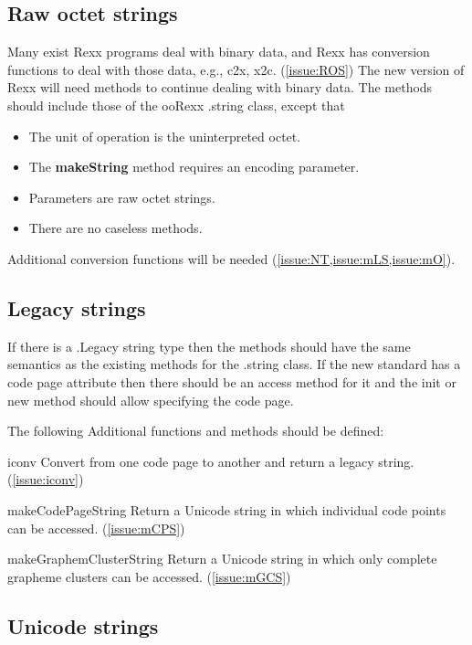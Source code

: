 \documentclass[b4paper]{article}
\begin{document}
\subsection{Raw octet strings}
Many exist Rexx programs deal with binary data,
and Rexx has conversion functions to deal with those data,
e.g., c2x, x2c.
(\cref{issue:ROS})
The new version of Rexx will need methods to continue dealing with binary data.
The methods should include those of the ooRexx .string class, except that
\begin{itemize}
\item The unit of operation is the uninterpreted octet.
\item The \textbf{makeString} method requires an encoding parameter.
\item Parameters are raw octet strings.
\item There are no caseless methods.
\end{itemize}

Additional conversion functions will be needed (\cref{issue:NT,issue:mLS,issue:mO}).

\subsection{Legacy strings}

If there is a .Legacy string type then the methods should have the
same semantics as the existing methods for the .string class.
If the new standard has a code page attribute then there should be an
access method for it and the init or new method should allow
specifying the code page.

The following Additional functions and methods should be defined:
\begin{definition}
\item [iconv] %
Convert from one code page to another and return a legacy string. (\cref{issue:iconv})
\item [makeCodePageString] %
Return a Unicode string in which individual code points can be accessed. (\cref{issue:mCPS})
\item [makeGraphemClusterString] %
Return a Unicode string in which only complete grapheme clusters can be accessed. (\cref{issue:mGCS})
\end{definition}

\subsection{Unicode strings}
\end{document}
